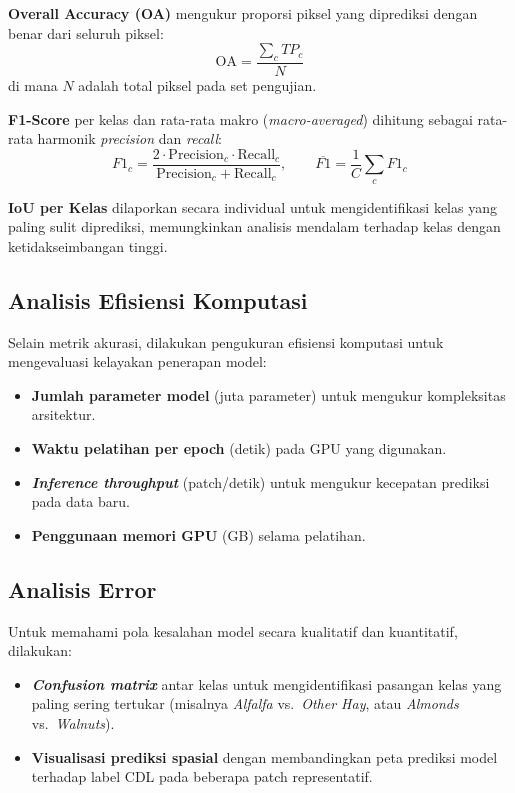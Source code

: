 \textbf{Overall Accuracy (OA)} mengukur proporsi piksel yang diprediksi dengan benar dari seluruh piksel:
\begin{equation}
    \text{OA} = \frac{\sum_{c} TP_c}{N}
\end{equation}
di mana $N$ adalah total piksel pada set pengujian.

\textbf{F1-Score} per kelas dan rata-rata makro (\textit{macro-averaged}) dihitung sebagai rata-rata harmonik \textit{precision} dan \textit{recall}:
\begin{equation}
    F1_c = \frac{2 \cdot \text{Precision}_c \cdot \text{Recall}_c}{\text{Precision}_c + \text{Recall}_c}, \qquad
    \overline{F1} = \frac{1}{C} \sum_{c} F1_c
\end{equation}

\textbf{IoU per Kelas} dilaporkan secara individual untuk mengidentifikasi kelas yang paling sulit diprediksi, memungkinkan analisis mendalam terhadap kelas dengan ketidakseimbangan tinggi.

\subsection{Analisis Efisiensi Komputasi}

Selain metrik akurasi, dilakukan pengukuran efisiensi komputasi untuk mengevaluasi kelayakan penerapan model:
\begin{itemize}
    \item \textbf{Jumlah parameter model} (juta parameter) untuk mengukur kompleksitas arsitektur.
    \item \textbf{Waktu pelatihan per epoch} (detik) pada GPU yang digunakan.
    \item \textbf{\textit{Inference throughput}} (patch/detik) untuk mengukur kecepatan prediksi pada data baru.
    \item \textbf{Penggunaan memori GPU} (GB) selama pelatihan.
\end{itemize}

\subsection{Analisis Error}

Untuk memahami pola kesalahan model secara kualitatif dan kuantitatif, dilakukan:
\begin{itemize}
    \item \textbf{\textit{Confusion matrix}} antar kelas untuk mengidentifikasi pasangan kelas yang paling sering tertukar (misalnya \textit{Alfalfa} vs.\ \textit{Other Hay}, atau \textit{Almonds} vs.\ \textit{Walnuts}).
    \item \textbf{Visualisasi prediksi spasial} dengan membandingkan peta prediksi model terhadap label CDL pada beberapa patch representatif.
\end{itemize}
